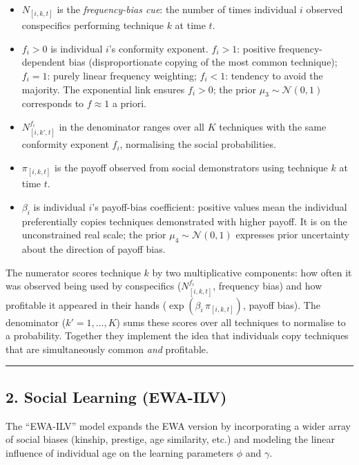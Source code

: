 \documentclass[
  letterpaper,
  DIV=11,
  numbers=noendperiod]{scrartcl}
\providecommand{\tightlist}{%
  \setlength{\itemsep}{0pt}\setlength{\parskip}{0pt}}\usepackage{longtable,booktabs,array}
\begin{document}
\begin{itemize}
\tightlist
\item
  \(N_{[i,k,t]}\) is the \emph{frequency-bias cue}: the number of times
  individual \(i\) observed conspecifics performing technique \(k\) at
  time \(t\).
\item
  \(f_i > 0\) is individual \(i\)'s conformity exponent. \(f_i > 1\):
  positive frequency-dependent bias (disproportionate copying of the
  most common technique); \(f_i = 1\): purely linear frequency
  weighting; \(f_i < 1\): tendency to avoid the majority. The
  exponential link ensures \(f_i > 0\); the prior
  \(\mu_3 \sim \mathcal{N}(0,1)\) corresponds to \(f \approx 1\) a
  priori.
\item
  \(N_{[i,k',t]}^{f_i}\) in the denominator ranges over all \(K\)
  techniques with the same conformity exponent \(f_i\), normalising the
  social probabilities.
\item
  \(\pi_{[i,k,t]}\) is the payoff observed from social demonstrators
  using technique \(k\) at time \(t\).
\item
  \(\beta_{i}\) is individual \(i\)'s payoff-bias coefficient: positive
  values mean the individual preferentially copies techniques
  demonstrated with higher payoff. It is on the unconstrained real
  scale; the prior \(\mu_4 \sim \mathcal{N}(0,1)\) expresses prior
  uncertainty about the direction of payoff bias.
\end{itemize}

The numerator scores technique \(k\) by two multiplicative components:
how often it was observed being used by conspecifics
(\(N_{[i,k,t]}^{f_i}\), frequency bias) and how profitable it appeared
in their hands (\(\exp(\beta_{i}\, \pi_{[i,k,t]})\), payoff bias). The
denominator (\(k' = 1, \ldots, K\)) sums these scores over all
techniques to normalise to a probability. Together they implement the
idea that individuals copy techniques that are simultaneously common
\emph{and} profitable.

\begin{center}\rule{0.5\linewidth}{0.5pt}\end{center}

\subsection{2. Social Learning (EWA-ILV)}\label{social-learning-ewa-ilv}

The ``EWA-ILV'' model expands the EWA version by incorporating a wider
array of social biases (kinship, prestige, age similarity, etc.) and
modeling the linear influence of individual age on the learning
parameters \(\phi\) and \(\gamma\).
\end{document}
